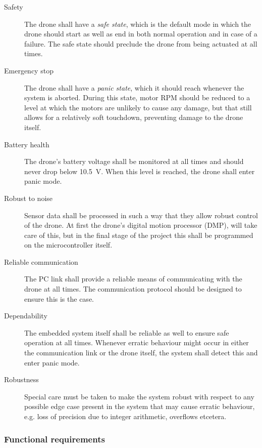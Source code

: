 \documentclass[final]{article}
\begin{document}
\begin{description}
	\item[Safety] The drone shall have a \emph{safe state}, which is the default mode in which the drone should start as well as end in both normal operation and in case of a failure. The safe state should preclude the drone from being actuated at all times.
	\item[Emergency stop] The drone shall have a \emph{panic state}, which it should reach whenever the system is aborted. During this state, motor RPM should be reduced to a level at which the motors are unlikely to cause any damage, but that still allows for a relatively soft touchdown, preventing damage to the drone itself.
	\item[Battery health] The drone's battery voltage shall be monitored at all times and should never drop below \SI{10.5}{\volt}. When this level is reached, the drone shall enter panic mode.
	\item[Robust to noise] Sensor data shall be processed in such a way that they allow robust control of the drone. At first the drone's digital motion processor (DMP), will take care of this, but in the final stage of the project this shall be programmed on the microcontroller itself.
	\item[Reliable communication] The PC link shall provide a reliable means of communicating with the drone at all times. The communication protocol should be designed to ensure this is the case.
	\item[Dependability] The embedded system itself shall be reliable as well to ensure safe operation at all times. Whenever erratic behaviour might occur in either the communication link or the drone itself, the system shall detect this and enter panic mode.
	\item[Robustness] Special care must be taken to make the system robust with respect to any possible edge case present in the system that may cause erratic behaviour, e.g. loss of precision due to integer arithmetic, overflows etcetera.
\end{description}

\subsubsection{Functional requirements}
\end{document}
